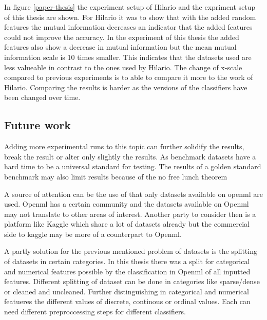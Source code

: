 \documentclass[a4paper,10pt]{article}
\begin{document}
In figure \ref{paper-thesis} the experiment setup of Hilario and the expriment setup of this thesis are shown\cite{Resil-1}. For Hilario it was to show that with the added random features the mutual information decreases an indicator that the added features could not improve the accuracy. In the experiment of this thesis the added features also show a decrease in mutual information but the mean mutual information scale is 10 times smaller. This indicates that the datasets used are less valueable in contrast to the ones used by Hilario. The change of x-scale compared to previous experiments is to able to compare it more to the work of Hilario. Comparing the results is harder as the versions of the classifiers have been changed over time.






\subsection{Future work}
Adding more experimental runs to this topic can further solidify the results, break the result or alter only slightly the results. As benchmark datasets have a hard time to be a universal standard for testing. The results of a golden standard benchmark may also limit results because of the no free lunch theorem

A source of attention can be the use of that only datasets available on openml are used. Openml has a certain community and the datasets available on Openml may not translate to other areas of interest. Another party to consider then is a platform like Kaggle which share a lot of datasets already but the commercial side to kaggle may be more of a counterpart to Openml. 

A partly solution for the previous mentioned problem of datasets is the splitting of datasets in certain categories. In this thesis there was a split for categorical and numerical features possible by the classification in Openml of all inputted features. Different splitting of dataset can be done in categories like sparse/dense or cleaned and uncleaned. Further distinguishing in categorical and numerical featueres the different values of discrete, continous or ordinal values. Each can need different preproccessing steps for different classifiers. 
\end{document}
